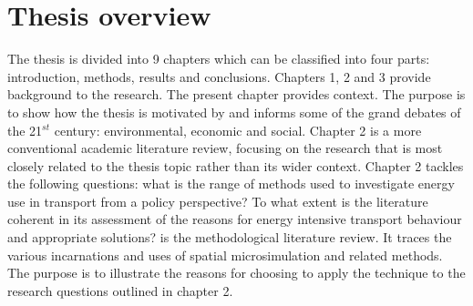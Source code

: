 % 
% 
% 
% 
% 


\section{Thesis overview}
The thesis is divided into 9 chapters which can be classified into four parts:
introduction, methods, results and conclusions.
Chapters 1, 2 and 3 provide background to the research. The present chapter
provides context. The purpose is to show how the thesis is motivated by
and informs some of the grand debates of the 21$^{st}$ century: environmental,
economic and social.
Chapter 2 is a more conventional academic literature review, focusing on the
research that is most closely related to the thesis topic rather than its wider
context. Chapter 2 tackles the following questions: what is the range of methods used
to investigate energy use in transport from a policy perspective? To what extent
is the literature coherent in its assessment of the reasons for energy intensive
transport behaviour and appropriate solutions? 
is the methodological literature review. It traces the various
incarnations and uses of spatial microsimulation and related methods.
The purpose is to illustrate
the reasons for choosing to apply the technique to the research questions
outlined in chapter 2.

